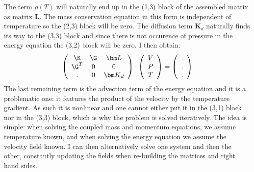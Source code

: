 The term $\rho(T)$ will naturally end up in the (1,3) block of the assembled matrix as matrix ${\bm L}$.
The mass conservation equation in this form is independent of temperature so the (2,3) block 
will be zero. The diffusion term ${\bm K}_d$ naturally finds its way to the (3,3) 
block and since there is not occurence of pressure in the energy equation the (3,2) 
block will be zero. I then obtain:
\[
\left(
\begin{array}{ccc}
\K & \G & {\bm L} \\
\G^T & 0 & 0 \\
. & 0 & {\bm K}_d 
\end{array}
\right)
\cdot
\left(
\begin{array}{c}
V \\ P \\ T 
\end{array}
\right)
=
\left(
\begin{array}{c}
. \\ . \\ .
\end{array}
\right)
\]
The last remaining term is the advection term of the energy equation and it is a problematic one:
it features the product of the velocity by the temperature gradient. 
As such it is nonlinear and one cannot either put it in the (3,1) block nor in the (3,3) block,
which is why the problem is solved iteratively. The idea is simple: when solving the 
coupled mass and momentum equations, we assume temperature known, and when solving the energy equation
we assume the velocity field known. I can then alternatively solve one system and then the other, constantly 
updating the fields when re-building the matrices and right hand sides.

